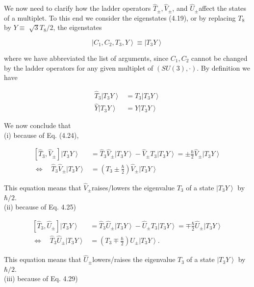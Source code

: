 \documentclass[10pt, letterpaper]{article}
\begin{document}
We now need to clarify how the ladder operators $\hat{T}_{ \pm}, \hat{V}_{ \pm}$, and $\hat{U}_{ \pm}$affect the states of a multiplet. To this end we consider the eigenstates (4.19), or by replacing $T_{8}$ by $Y \equiv$ $\sqrt{3} T_{8} / 2$, the eigenstates

$$
\left|C_{1}, C_{2}, T_{3}, Y\right\rangle \equiv\left|T_{3} Y\right\rangle
$$

where we have abbreviated the list of arguments, since $C_{1}, C_{2}$ cannot be changed by the ladder operators for any given multiplet of $(S U(3), \cdot)$. By definition we have

$$
\begin{aligned}
\hat{T}_{3}\left|T_{3} Y\right\rangle & =T_{3}\left|T_{3} Y\right\rangle \\
\hat{Y}\left|T_{3} Y\right\rangle & =Y\left|T_{3} Y\right\rangle
\end{aligned}
$$

We now conclude that\\
(i) because of Eq. (4.24),

$$
\begin{aligned}
{\left[\hat{T}_{3}, \hat{V}_{ \pm}\right]\left|T_{3} Y\right\rangle } & =\hat{T}_{3} \hat{V}_{ \pm}\left|T_{3} Y\right\rangle-\hat{V}_{ \pm} T_{3}\left|T_{3} Y\right\rangle= \pm \frac{\hbar}{2} \hat{V}_{ \pm}\left|T_{3} Y\right\rangle \\
\Longleftrightarrow \quad \hat{T}_{3} \hat{V}_{ \pm}\left|T_{3} Y\right\rangle & =\left(T_{3} \pm \frac{\hbar}{2}\right) \hat{V}_{ \pm}\left|T_{3} Y\right\rangle
\end{aligned}
$$

This equation means that $\hat{V}_{ \pm}$raises/lowers the eigenvalue $T_{3}$ of a state $\left|T_{3} Y\right\rangle$ by $\hbar / 2$.\\
(ii) because of Eq. 4.25)

$$
\begin{aligned}
{\left[\hat{T}_{3}, \hat{U}_{ \pm}\right]\left|T_{3} Y\right\rangle } & =\hat{T}_{3} \hat{U}_{ \pm}\left|T_{3} Y\right\rangle-\hat{U}_{ \pm} T_{3}\left|T_{3} Y\right\rangle=\mp \frac{\hbar}{2} \hat{U}_{ \pm}\left|T_{3} Y\right\rangle \\
\Longleftrightarrow \quad \hat{T}_{3} \hat{U}_{ \pm}\left|T_{3} Y\right\rangle & =\left(T_{3} \mp \frac{\hbar}{2}\right) \hat{U}_{ \pm}\left|T_{3} Y\right\rangle .
\end{aligned}
$$

This equation means that $\hat{U}_{ \pm}$lowers/raises the eigenvalue $T_{3}$ of a state $\left|T_{3} Y\right\rangle$ by $\hbar / 2$.\\
(iii) because of Eq. 4.29)
\end{document}
